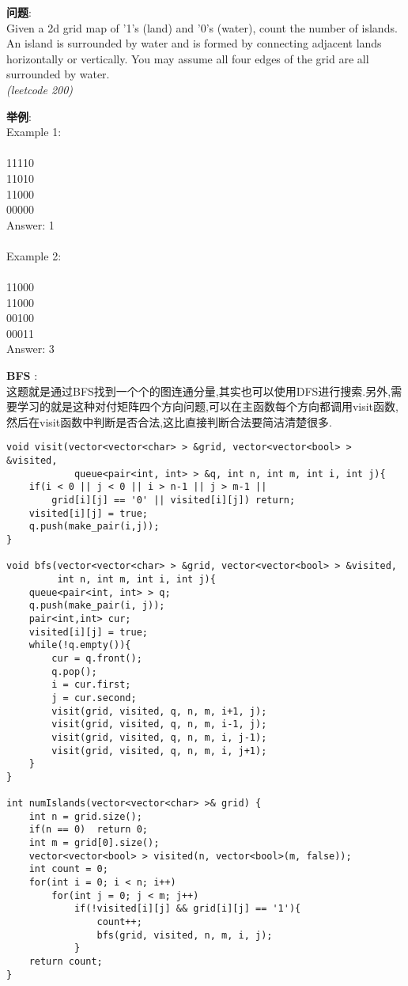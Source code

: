     
\begin{description}
    \item{\textbf{问题}}: \\
Given a 2d grid map of '1's (land) and '0's (water), count the number of islands. An island is surrounded by water and is formed by connecting adjacent lands horizontally or vertically. You may assume all four edges of the grid are all surrounded by water.\\
\textit{(leetcode 200)}
    \item{\textbf{举例}}: \\
Example 1:\\
\\
11110\\
11010\\
11000\\
00000\\
Answer: 1\\
\\
Example 2:\\
\\
11000\\
11000\\
00100\\
00011\\
Answer: 3\\
    \item{\textbf{BFS}} : 
    \\这题就是通过BFS找到一个个的图连通分量,其实也可以使用DFS进行搜索.另外,需要学习的就是这种对付矩阵四个方向问题,可以在主函数每个方向都调用visit函数,然后在visit函数中判断是否合法,这比直接判断合法要简洁清楚很多.
    \begin{lstlisting}
void visit(vector<vector<char> > &grid, vector<vector<bool> > &visited,
			queue<pair<int, int> > &q, int n, int m, int i, int j){
	if(i < 0 || j < 0 || i > n-1 || j > m-1 || 
		grid[i][j] == '0' || visited[i][j])	return;
	visited[i][j] = true;
	q.push(make_pair(i,j));
}

void bfs(vector<vector<char> > &grid, vector<vector<bool> > &visited,
		 int n, int m, int i, int j){
	queue<pair<int, int> > q;
	q.push(make_pair(i, j));
	pair<int,int> cur;
	visited[i][j] = true;
	while(!q.empty()){
		cur = q.front();
		q.pop();
		i = cur.first;
		j = cur.second;
		visit(grid, visited, q, n, m, i+1, j);
		visit(grid, visited, q, n, m, i-1, j);
		visit(grid, visited, q, n, m, i, j-1);
		visit(grid, visited, q, n, m, i, j+1);
	}
}

int numIslands(vector<vector<char> >& grid) {
	int n = grid.size();
	if(n == 0)	return 0;
	int m = grid[0].size();
	vector<vector<bool> > visited(n, vector<bool>(m, false));
	int count = 0;
	for(int i = 0; i < n; i++)
		for(int j = 0; j < m; j++)
			if(!visited[i][j] && grid[i][j] == '1'){
				count++;
				bfs(grid, visited, n, m, i, j);
			}
	return count;
}
    \end{lstlisting}
\end{description}
